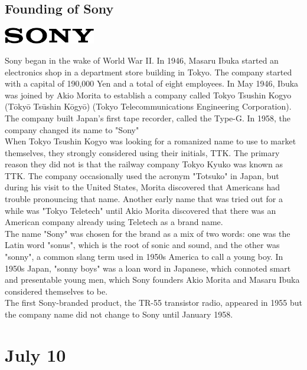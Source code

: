 \documentclass[11pt]{report}
\begin{document}
\subsection{Founding of Sony}
\vspace{2mm}\begin{center}\includegraphics[width=4cm]{./img/sonylogo.jpg}\end{center}
Sony began in the wake of World War II. In 1946, Masaru Ibuka started an electronics shop in a department store building in Tokyo. The company started with a capital of 190,000 Yen and a total of eight employees. In May 1946, Ibuka was joined by Akio Morita to establish a company called Tokyo Tsushin Kogyo (Tōkyō Tsūshin Kōgyō) (Tokyo Telecommunications Engineering Corporation). The company built Japan's first tape recorder, called the Type-G. In 1958, the company changed its name to "Sony"\\ \indent When Tokyo Tsushin Kogyo was looking for a romanized name to use to market themselves, they strongly considered using their initials, TTK. The primary reason they did not is that the railway company Tokyo Kyuko was known as TTK. The company occasionally used the acronym "Totsuko" in Japan, but during his visit to the United States, Morita discovered that Americans had trouble pronouncing that name. Another early name that was tried out for a while was "Tokyo Teletech" until Akio Morita discovered that there was an American company already using Teletech as a brand name.\\
\indent The name "Sony" was chosen for the brand as a mix of two words: one was the Latin word "sonus", which is the root of sonic and sound, and the other was "sonny", a common slang term used in 1950s America to call a young boy. In 1950s Japan, "sonny boys" was a loan word in Japanese, which connoted smart and presentable young men, which Sony founders Akio Morita and Masaru Ibuka considered themselves to be.\\ \indent The first Sony-branded product, the TR-55 transistor radio, appeared in 1955 but the company name did not change to Sony until January 1958.
\section{July 10}
\end{document}
